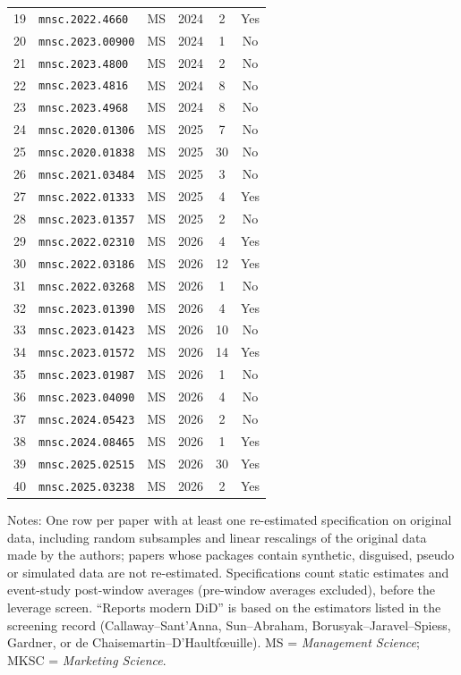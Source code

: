 \begin{longtable}{rlcccc}
19 & \texttt{mnsc.2022.4660} & MS & 2024 & 2 & Yes \\
20 & \texttt{mnsc.2023.00900} & MS & 2024 & 1 & No \\
21 & \texttt{mnsc.2023.4800} & MS & 2024 & 2 & No \\
22 & \texttt{mnsc.2023.4816} & MS & 2024 & 8 & No \\
23 & \texttt{mnsc.2023.4968} & MS & 2024 & 8 & No \\
24 & \texttt{mnsc.2020.01306} & MS & 2025 & 7 & No \\
25 & \texttt{mnsc.2020.01838} & MS & 2025 & 30 & No \\
26 & \texttt{mnsc.2021.03484} & MS & 2025 & 3 & No \\
27 & \texttt{mnsc.2022.01333} & MS & 2025 & 4 & Yes \\
28 & \texttt{mnsc.2023.01357} & MS & 2025 & 2 & No \\
29 & \texttt{mnsc.2022.02310} & MS & 2026 & 4 & Yes \\
30 & \texttt{mnsc.2022.03186} & MS & 2026 & 12 & Yes \\
31 & \texttt{mnsc.2022.03268} & MS & 2026 & 1 & No \\
32 & \texttt{mnsc.2023.01390} & MS & 2026 & 4 & Yes \\
33 & \texttt{mnsc.2023.01423} & MS & 2026 & 10 & No \\
34 & \texttt{mnsc.2023.01572} & MS & 2026 & 14 & Yes \\
35 & \texttt{mnsc.2023.01987} & MS & 2026 & 1 & No \\
36 & \texttt{mnsc.2023.04090} & MS & 2026 & 4 & No \\
37 & \texttt{mnsc.2024.05423} & MS & 2026 & 2 & No \\
38 & \texttt{mnsc.2024.08465} & MS & 2026 & 1 & Yes \\
39 & \texttt{mnsc.2025.02515} & MS & 2026 & 30 & Yes \\
40 & \texttt{mnsc.2025.03238} & MS & 2026 & 2 & Yes \\
\end{longtable}
\vspace{-0.5\baselineskip}
{\footnotesize\noindent Notes: One row per paper with at least one re-estimated specification on original data, including random subsamples and linear rescalings of the original data made by the authors; papers whose packages contain synthetic, disguised, pseudo or simulated data are not re-estimated. Specifications count static estimates and event-study post-window averages (pre-window averages excluded), before the leverage screen. ``Reports modern DiD'' is based on the estimators listed in the screening record (Callaway--Sant'Anna, Sun--Abraham, Borusyak--Jaravel--Spiess, Gardner, or de Chaisemartin--D'Haultf\oe{}uille). MS = \emph{Management Science}; MKSC = \emph{Marketing Science}.\par}
\endgroup
